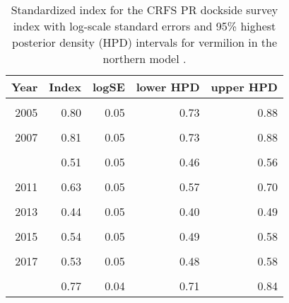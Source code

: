 \documentclass[
]{article}
\begin{document}
\begin{table}

\caption{\label{tab:tab-index-crfspr}Standardized index for the CRFS PR dockside survey index with log-scale standard errors and 95\% highest
       posterior density (HPD) intervals for vermilion in the northern model .}
\centering
\begin{tabular}[t]{rrrrr}
\toprule
Year & Index & logSE & lower HPD & upper HPD\\
\midrule
\cellcolor{gray!6}{2004} & \cellcolor{gray!6}{0.80} & \cellcolor{gray!6}{0.05} & \cellcolor{gray!6}{0.72} & \cellcolor{gray!6}{0.87}\\
2005 & 0.80 & 0.05 & 0.73 & 0.88\\
\cellcolor{gray!6}{2006} & \cellcolor{gray!6}{0.86} & \cellcolor{gray!6}{0.04} & \cellcolor{gray!6}{0.78} & \cellcolor{gray!6}{0.93}\\
2007 & 0.81 & 0.05 & 0.73 & 0.88\\
\cellcolor{gray!6}{2008} & \cellcolor{gray!6}{0.58} & \cellcolor{gray!6}{0.05} & \cellcolor{gray!6}{0.52} & \cellcolor{gray!6}{0.65}\\
\addlinespace
2009 & 0.51 & 0.05 & 0.46 & 0.56\\
\cellcolor{gray!6}{2010} & \cellcolor{gray!6}{0.62} & \cellcolor{gray!6}{0.05} & \cellcolor{gray!6}{0.55} & \cellcolor{gray!6}{0.68}\\
2011 & 0.63 & 0.05 & 0.57 & 0.70\\
\cellcolor{gray!6}{2012} & \cellcolor{gray!6}{0.52} & \cellcolor{gray!6}{0.05} & \cellcolor{gray!6}{0.47} & \cellcolor{gray!6}{0.58}\\
2013 & 0.44 & 0.05 & 0.40 & 0.49\\
\addlinespace
\cellcolor{gray!6}{2014} & \cellcolor{gray!6}{0.49} & \cellcolor{gray!6}{0.05} & \cellcolor{gray!6}{0.44} & \cellcolor{gray!6}{0.54}\\
2015 & 0.54 & 0.05 & 0.49 & 0.58\\
\cellcolor{gray!6}{2016} & \cellcolor{gray!6}{0.57} & \cellcolor{gray!6}{0.05} & \cellcolor{gray!6}{0.52} & \cellcolor{gray!6}{0.62}\\
2017 & 0.53 & 0.05 & 0.48 & 0.58\\
\cellcolor{gray!6}{2018} & \cellcolor{gray!6}{0.63} & \cellcolor{gray!6}{0.04} & \cellcolor{gray!6}{0.58} & \cellcolor{gray!6}{0.69}\\
\addlinespace
2019 & 0.77 & 0.04 & 0.71 & 0.84\\
\bottomrule
\end{tabular}
\end{table}
\end{document}
